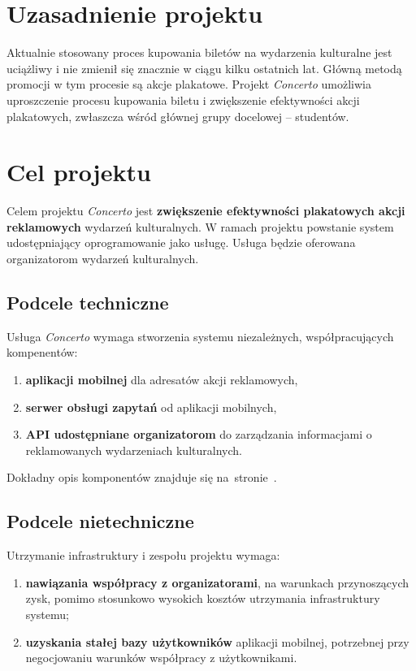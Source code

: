 \documentclass[10pt]{dokument-ppi}
\begin{document}
\MakeDokumentMeta

\section{Uzasadnienie projektu}

Aktualnie stosowany proces kupowania biletów na wydarzenia kulturalne jest
uciążliwy i nie zmienił się znacznie w ciągu kilku ostatnich lat. Główną metodą
promocji w tym procesie są akcje plakatowe. Projekt \emph{Concerto} umożliwia
uproszczenie procesu kupowania biletu i zwiększenie efektywności akcji
plakatowych, zwłaszcza wśród głównej grupy docelowej -- studentów.


\section{Cel projektu}

Celem projektu \emph{Concerto} jest \textbf{zwiększenie efektywności plakatowych
akcji reklamowych} wydarzeń kulturalnych. W ramach projektu powstanie system
udostępniający oprogramowanie jako usługę. Usługa będzie oferowana organizatorom
wydarzeń kulturalnych.

\subsection{Podcele techniczne}

Usługa \emph{Concerto} wymaga stworzenia systemu niezależnych, współpracujących
kompenentów:
\begin{enumerate}
    \item \textbf{aplikacji mobilnej} dla adresatów akcji reklamowych,
    \item \textbf{serwer obsługi zapytań} od aplikacji mobilnych,
    \item \textbf{API udostępniane organizatorom} do zarządzania informacjami o
        reklamowanych wydarzeniach kulturalnych.
\end{enumerate}
Dokładny opis komponentów znajduje się na~stronie~\pageref{sec:produkty}.


\subsection{Podcele nietechniczne}

Utrzymanie infrastruktury i zespołu projektu wymaga:
\begin{enumerate}
    \item \textbf{nawiązania współpracy z organizatorami}, na warunkach
        przynoszących zysk, pomimo stosunkowo wysokich kosztów utrzymania
        infrastruktury systemu;
    \item \textbf{uzyskania stałej bazy użytkowników} aplikacji mobilnej,
        potrzebnej przy negocjowaniu warunków współpracy z użytkownikami.
\end{enumerate}
\end{document}
